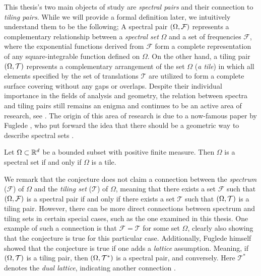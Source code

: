 \documentclass[../thesis.tex]{subfiles}
\begin{document}
This thesis's two main objects of study are \emph{spectral pairs} and their connection to \emph{tiling pairs}. While we will provide a formal definition later, we intuitively understand them to be the following; A spectral pair $(\Omega,\mathcal{F})$ represents a complementary relationship between a \emph{spectral set} $\Omega$ and a set of frequencies $\mathcal{F}$, where the exponential functions derived from $\mathcal{F}$ form a complete representation of any square-integrable function defined on $\Omega$. On the other hand, a tiling pair $(\Omega,\mathcal{T})$ represents a complementary arrangement of the set $\Omega$ (\emph{a tile}) in which all elements specified by the set of translations $\mathcal{T}$ are utilized to form a complete surface covering without any gaps or overlaps. Despite their individual importance in the fields of analysis and geometry, the relation between spectra and tiling pairs still remains an enigma and continues to be an active area of research, see \cite{levFugledeConjectureConvex2022,kissFugledeConjectureHolds2022}. The origin of this area of research is due to a now-famous paper by Fuglede \cite{fugledeCommutingSelfadjointPartial1974}, who put forward the idea that there should be a geometric way to describe spectral sets \cite{lagariasOrthonormalBasesExponentials2000,liDualityPropertiesSpectra2010}. 

\begin{conjecture}
    Let $\Omega\subset \mathbb{R}^d$ be a bounded subset with positive finite measure. Then $\Omega$ is a spectral set if and only if $\Omega$ is a tile. 
\end{conjecture}

We remark that the conjecture does not claim a connection between the \emph{spectrum} ($\mathcal{F}$) of $\Omega$ and the \emph{tiling set} ($\mathcal{T}$) of $\Omega$, meaning that there exists a set $\mathcal{F}$ such that $(\Omega,\mathcal{F})$ is a spectral pair if and only if there exists a set $\mathcal{T}$ such that $(\Omega,\mathcal{T})$ is a tiling pair. However, there can be more direct connections between spectrum and tiling sets in certain special cases, such as the one examined in this thesis. One example of such a connection is that $\mathcal{F}=\mathcal{T}$ for some set $\Omega$, clearly also showing that the conjecture is true for this particular case. Additionally, Fuglede himself showed that the conjecture is true if one adds a \emph{lattice} assumption. Meaning, if $(\Omega,\mathcal{T})$ is a tiling pair, then $(\Omega,\mathcal{T^*})$ is a spectral pair, and conversely. Here $\mathcal{T^*}$ denotes the \emph{dual lattice}, indicating another connection \cite{fugledeCommutingSelfadjointPartial1974}.
\end{document}
